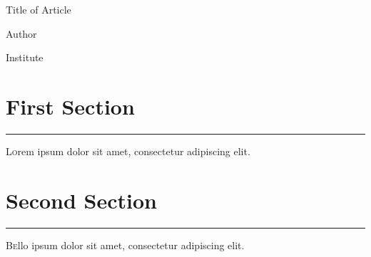 \documentclass{article}
\begin{document}
    \begin{center}
        {\LARGE Title of Article}
        \vspace*{4mm}
        
        Author

        Institute
        \vspace*{20mm}
    \end{center}


    \begin{multicols}{2}
        \section{First Section}
        \vspace*{-3mm}
        \hrule  
        \vspace*{5mm} 
        \lettrine[nindent=0em,findent=0.5em,lines=3]{L} orem ipsum dolor sit amet, consectetur adipiscing elit.
        \lipsum[2-3]

        \section{Second Section}
        \vspace*{-3mm}
        \hrule  
        \vspace*{5mm} 
        \lettrine[nindent=1em,lines=3]{\color{red-600}B} ello ipsum dolor sit amet, consectetur adipiscing elit.
        \lipsum[4]
    \end{multicols}
    
\end{document}
